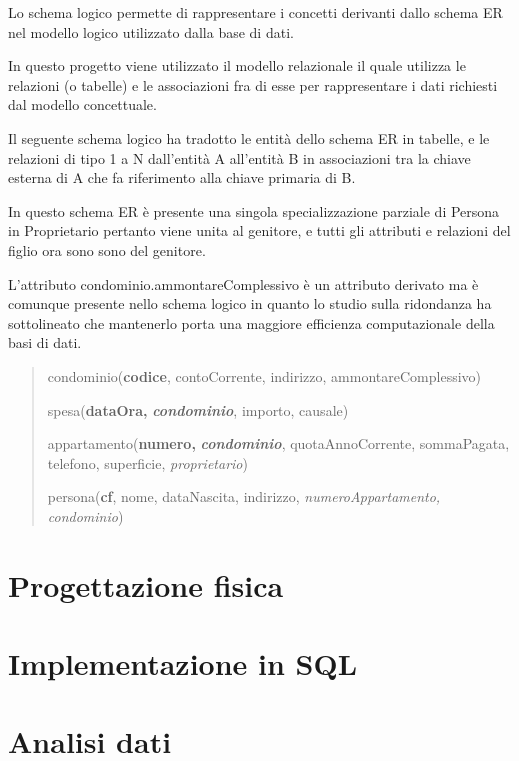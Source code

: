 \documentclass[
]{article}
\begin{document}
Lo schema logico permette di rappresentare i concetti derivanti dallo
schema ER nel modello logico utilizzato dalla base di dati.

In questo progetto viene utilizzato il modello relazionale il quale
utilizza le relazioni (o tabelle) e le associazioni fra di esse per
rappresentare i dati richiesti dal modello concettuale.

Il seguente schema logico ha tradotto le entità dello schema ER in
tabelle, e le relazioni di tipo 1 a N dall'entità A all'entità B in
associazioni tra la chiave esterna di A che fa riferimento alla chiave
primaria di B.

In questo schema ER è presente una singola specializzazione parziale di
Persona in Proprietario pertanto viene unita al genitore, e tutti gli
attributi e relazioni del figlio ora sono sono del genitore.

L'attributo condominio.ammontareComplessivo è un attributo derivato ma è
comunque presente nello schema logico in quanto lo studio sulla
ridondanza ha sottolineato che mantenerlo porta una maggiore efficienza
computazionale della basi di dati.

\begin{quote}
condominio(\textbf{codice}, contoCorrente, indirizzo,
ammontareComplessivo)

spesa(\textbf{dataOra,} \textbf{\emph{condominio}}, importo, causale)

appartamento(\textbf{numero,} \textbf{\emph{condominio}},
quotaAnnoCorrente, sommaPagata, telefono, superficie,
\emph{proprietario})

persona(\textbf{cf}, nome, dataNascita, indirizzo,
\emph{numeroAppartamento, condominio})
\end{quote}

\hypertarget{progettazione-fisica}{%
\section{Progettazione fisica}\label{progettazione-fisica}}

\hypertarget{implementazione-in-sql}{%
\section{Implementazione in SQL}\label{implementazione-in-sql}}

\hypertarget{analisi-dati}{%
\section{Analisi dati}\label{analisi-dati}}
\end{document}
